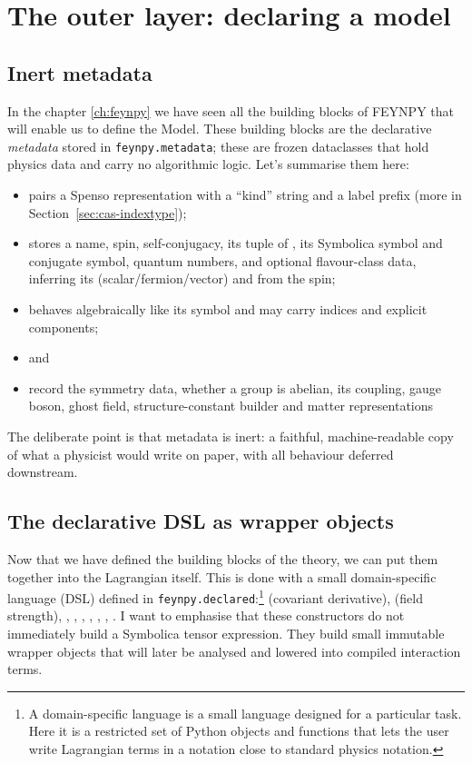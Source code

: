 \section{The outer layer: declaring a model}
\label{sec:internals-declaration}

\subsection{Inert metadata}

In the chapter \ref{ch:feynpy} we have seen all the building blocks of FEYNPY that will enable us to define the Model. These building blocks are the declarative \emph{metadata} stored in \texttt{feynpy.metadata}; these are frozen dataclasses that hold physics data and carry no algorithmic logic. Let's summarise them here:
\begin{itemize}
    \item {} pairs a Spenso representation with a ``kind'' string and a label prefix (more in Section~\ref{sec:cas-indextype});
    \item {} stores a name, spin, self-conjugacy, its tuple of , its Symbolica symbol and conjugate symbol, quantum numbers, and optional flavour-class data, inferring its  (scalar/fermion/vector) and  from the spin;
    \item {} behaves algebraically like its symbol and may carry indices and explicit components;
    \item {} and
    \item {} record the symmetry data, whether a group is abelian, its coupling, gauge boson, ghost field, structure-constant builder and matter representations
\end{itemize}

The deliberate point is that metadata is inert: a faithful, machine-readable copy of what a physicist would write on paper, with all behaviour deferred downstream.

\subsection{The declarative DSL as wrapper objects}

Now that we have defined the building blocks of the theory, we can put them together into the Lagrangian itself. This is done with a small domain-specific language (DSL) defined in \texttt{feynpy.declared}:\footnote{A domain-specific language is a small language designed for a particular task. Here it is a restricted set of Python objects and functions that lets the user write Lagrangian terms in a notation close to standard physics notation.}  (covariant derivative),  (field strength), , , , , , , . I want to emphasise that these constructors do not immediately build a Symbolica tensor expression. They build small immutable wrapper objects that will later be analysed and lowered into compiled interaction terms.

